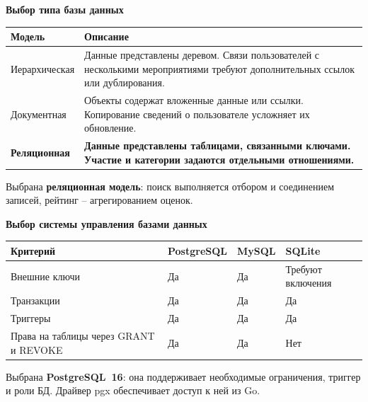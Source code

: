 \documentclass[12pt]{article}
\newcommand{\slidetitle}[1]{%
    {\centering\fontsize{28}{34}\selectfont\bfseries #1\par}%
    \vspace{12bp}%
}
\newenvironment{slide}[1]{\clearpage\slidetitle{#1}}{\par}
\begin{document}
\begin{slide}{Выбор типа базы данных}
\begin{tabularx}{\textwidth}{|L{210bp}|Y|}
    \hline
    \textbf{Модель} & \textbf{Описание} \\
    \hline
    Иерархическая & Данные представлены деревом. Связи пользователей с несколькими мероприятиями требуют дополнительных ссылок или дублирования. \\
    \hline
    Документная & Объекты содержат вложенные данные или ссылки. Копирование сведений о пользователе усложняет их обновление. \\
    \hline
    \textbf{Реляционная} & \textbf{Данные представлены таблицами, связанными ключами. Участие и категории задаются отдельными отношениями.} \\
    \hline
\end{tabularx}

\vspace{12bp}
Выбрана \textbf{реляционная модель}: поиск выполняется отбором и соединением записей, рейтинг -- агрегированием оценок.
\end{slide}

\begin{slide}{Выбор системы управления базами данных}
\begin{tabularx}{\textwidth}{|L{270bp}|Y|Y|Y|}
    \hline
    \textbf{Критерий} & \textbf{PostgreSQL} & \textbf{MySQL} & \textbf{SQLite} \\
    \hline
    Внешние ключи & Да & Да & Требуют включения \\
    \hline
    Транзакции & Да & Да & Да \\
    \hline
    Триггеры & Да & Да & Да \\
    \hline
    Права на таблицы через GRANT и REVOKE & Да & Да & Нет \\
    \hline
\end{tabularx}

\vspace{16bp}
Выбрана \textbf{PostgreSQL~16}: она поддерживает необходимые ограничения, триггер и роли БД. Драйвер pgx обеспечивает доступ к ней из Go.
\end{slide}
\end{document}
